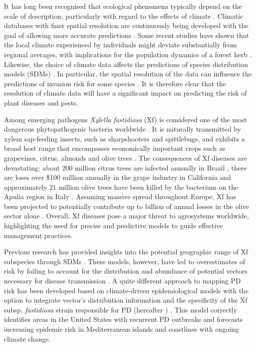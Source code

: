 It has long  been recognised that ecological phenomena typically depend on
the scale of description,  particularly with regard to the effects of climate
\cite{Levin1992}. Climatic databases with finer spatial resolution are
continuously being developed with the goal of allowing more accurate
predictions \cite{Navarro-Racines2020}.  Some recent studies have shown that
the local climate experienced by individuals might deviate substantially from
regional averages, with implications for the population dynamics of a forest
herb \cite{Christiansen2024}. Likewise, the choice of climate data affects the
predictions of species distribution models (SDMs) \cite{Abdulwahab2022}. In
particular, the spatial resolution of the data can influence the predictions of
invasion risk for some species \cite{Dubos2023}.  It is therefore clear that
the resolution of climate data will have a significant impact on predicting the
risk of plant diseases and pests.

Among emerging pathogens \textit{Xylella fastidiosa} (Xf) is considered one
of the most dangerous phytopathogenic bacteria worldwide
\cite{Hopkins2002,EFSA_xf}. It is naturally transmitted by xylem sap-feeding
insects, such as sharpshooters and spittlebugs, and exhibits a broad host range
that encompasses economically important crops such as grapevines, citrus,
almonds and olive trees \cite{redak2004biology,EFSA_xf}. The consequences of Xf
diseases are devastating: about 200 million citrus trees are  infected annually
in Brazil \cite{Lindow2019}, there are	loses over \$100 million annually in
the grape industry in California  \cite{tumber2014pierce} and approximately
$21$ million olive trees have been killed by the bacterium on the Apulia region
in Italy  \cite{Sabelli2023}. Assuming massive spread throughout Europe, Xf has
been projected to potentially contribute up to  billion of annual
losses in the olive sector alone \cite{Schneider2020}. Overall, Xf diseases
pose a major threat to agrosystems worldwide, highlighting the need for precise
and predictive models to guide effective management practices.

Previous research has provided insights into the potential geographic range
of  Xf subspecies through SDMs \cite{Bosso2016b, Godefroid2022}. These models,
however, have led to overestimates of risk by failing to account for the
distribution and abundance of potential vectors necessary for disease
transmission  \cite{Godefroid2022_vector}.  A quite different approach to
mapping PD risk has been developed based on climate-driven epidemiological
models with the option to integrate vector's distribution information and the
specificity of the Xf  subsp. \textit{fastidiosa} strain responsible for PD
(hereafter \xf{}) \cite{GimenezRomero2022_CommsBio}. This model correctly
identifies
areas in the United States with recurrent  PD outbreaks and forecasts
increasing epidemic risk in Mediterranean islands and coastlines  with ongoing
climate change.

